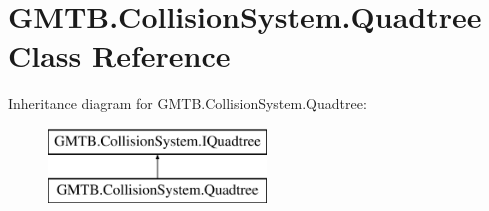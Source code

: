 \hypertarget{class_g_m_t_b_1_1_collision_system_1_1_quadtree}{}\section{G\+M\+T\+B.\+Collision\+System.\+Quadtree Class Reference}
\label{class_g_m_t_b_1_1_collision_system_1_1_quadtree}
Inheritance diagram for G\+M\+T\+B.\+Collision\+System.\+Quadtree\+:\begin{figure}[H]
\begin{center}
\leavevmode
\includegraphics[height=2.000000cm]{class_g_m_t_b_1_1_collision_system_1_1_quadtree}
\end{center}
\end{figure}
